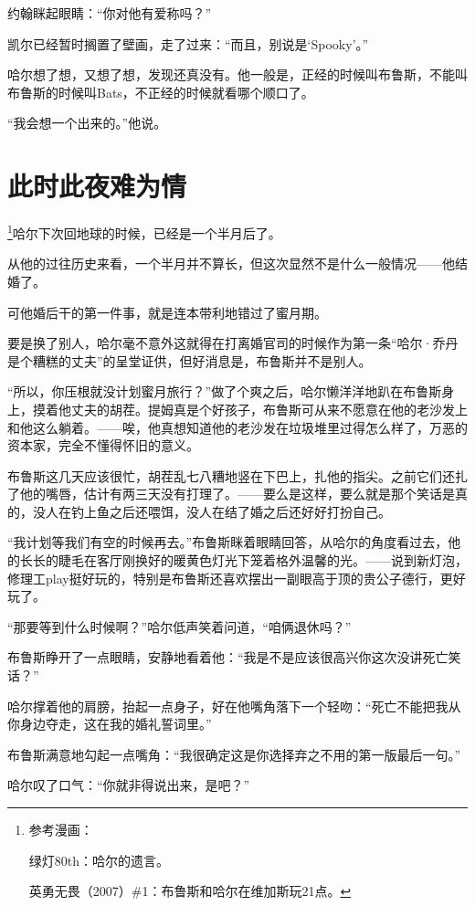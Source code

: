 \documentclass[../main]{subfiles}
\begin{document}
约翰眯起眼睛：“你对他有爱称吗？”

凯尔已经暂时搁置了壁画，走了过来：“而且，别说是‘Spooky’。”

哈尔想了想，又想了想，发现还真没有。他一般是，正经的时候叫布鲁斯，不能叫布鲁斯的时候叫Bats，不正经的时候就看哪个顺口了。

“我会想一个出来的。”他说。

\section{此时此夜难为情}

\footnote[1]{参考漫画：

    绿灯80th：哈尔的遗言。

    英勇无畏（2007）\#1：布鲁斯和哈尔在维加斯玩21点。}哈尔下次回地球的时候，已经是一个半月后了。

从他的过往历史来看，一个半月并不算长，但这次显然不是什么一般情况——他结婚了。

可他婚后干的第一件事，就是连本带利地错过了蜜月期。

要是换了别人，哈尔毫不意外这就得在打离婚官司的时候作为第一条“哈尔·乔丹是个糟糕的丈夫”的呈堂证供，但好消息是，布鲁斯并不是别人。

“所以，你压根就没计划蜜月旅行？”做了个爽之后，哈尔懒洋洋地趴在布鲁斯身上，摸着他丈夫的胡茬。提姆真是个好孩子，布鲁斯可从来不愿意在他的老沙发上和他这么躺着。——唉，他真想知道他的老沙发在垃圾堆里过得怎么样了，万恶的资本家，完全不懂得怀旧的意义。

布鲁斯这几天应该很忙，胡茬乱七八糟地竖在下巴上，扎他的指尖。之前它们还扎了他的嘴唇，估计有两三天没有打理了。——要么是这样，要么就是那个笑话是真的，没人在钓上鱼之后还喂饵，没人在结了婚之后还好好打扮自己。

“我计划等我们有空的时候再去。”布鲁斯眯着眼睛回答，从哈尔的角度看过去，他的长长的睫毛在客厅刚换好的暖黄色灯光下笼着格外温馨的光。——说到新灯泡，修理工play挺好玩的，特别是布鲁斯还喜欢摆出一副眼高于顶的贵公子德行，更好玩了。

“那要等到什么时候啊？”哈尔低声笑着问道，“咱俩退休吗？”

布鲁斯睁开了一点眼睛，安静地看着他：“我是不是应该很高兴你这次没讲死亡笑话？”

哈尔撑着他的肩膀，抬起一点身子，好在他嘴角落下一个轻吻：“死亡不能把我从你身边夺走，这在我的婚礼誓词里。”

布鲁斯满意地勾起一点嘴角：“我很确定这是你选择弃之不用的第一版最后一句。”

哈尔叹了口气：“你就非得说出来，是吧？”
\end{document}
